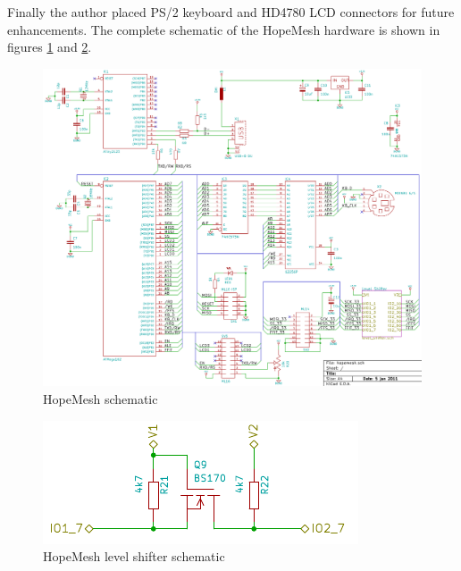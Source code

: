 Finally the author placed PS/2 keyboard and HD4780 LCD connectors for future enhancements. The complete schematic of the HopeMesh hardware is shown in figures \ref{fig:hopemesh-sch} and \ref{fig:hopemesh-levelshifter-sch}.

\begin{figure}[H]
\centering
\includegraphics[angle=90, scale=0.83]{figures/hopemesh-sch-crop}
\caption{HopeMesh schematic}
\label{fig:hopemesh-sch}
\end{figure}

\begin{figure}[H]
\centering
\includegraphics[]{figures/hopemesh-sch-levelshifter-crop.pdf}
\caption{HopeMesh level shifter schematic}
\label{fig:hopemesh-levelshifter-sch}
\end{figure}

